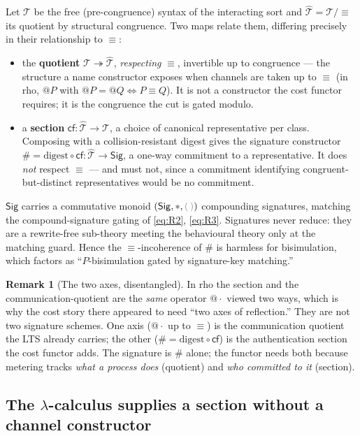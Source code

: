 \documentclass[11pt]{article}
\makeatletter
\theoremstyle{definition}
\newtheorem{remark}[definition]{Remark}
\theoremstyle{plain}
\newcommand{\dec}[1]{\textcolor{costgray}{#1}}   %
\newcommand{\Sig}{\mathsf{Sig}}
\newcommand{\nil}{\dec{(\,)}}                  %
\newcommand{\Seq}{\equiv}
\newcommand{\hashf}{\#}
\newcommand{\quot}[1]{@#1}
\newcommand{\cf}{\mathsf{cf}}
\newcommand{\Term}{\mathcal{T}}
\newcommand{\cTerm}{\widehat{\mathcal{T}}}
\makeatother
\begin{document}
Let $\Term$ be the free (pre-congruence) syntax of the interacting sort
and $\cTerm = \Term/{\Seq}$ its quotient by structural congruence. Two
maps relate them, differing precisely in their relationship to $\Seq$:
%
\begin{itemize}[leftmargin=1.6em,itemsep=2pt]
  \item the \textbf{quotient} $\Term \twoheadrightarrow \cTerm$,
    \emph{respecting} $\Seq$, invertible up to congruence --- the
    structure a name constructor exposes when channels are taken up to
    $\Seq$ (in rho, $\quot{P}$ with $\quot{P}=\quot{Q}\iff P\Seq Q$). It
    is not a constructor the cost functor requires; it is the congruence
    the cut is gated modulo.
  \item a \textbf{section} $\cf : \cTerm \to \Term$, a choice of
    canonical representative per class. Composing with a
    collision-resistant digest gives the signature constructor
    $\hashf = \mathrm{digest}\circ\cf : \cTerm \to \Sig$, a one-way
    commitment to a representative. It does \emph{not} respect $\Seq$ ---
    and must not, since a commitment identifying congruent-but-distinct
    representatives would be no commitment.
\end{itemize}
%
$\Sig$ carries a commutative monoid $(\Sig,*,\nil)$ compounding
signatures, matching the compound-signature gating of \eqref{eq:R2},
\eqref{eq:R3}. Signatures never reduce: they are a rewrite-free
sub-theory meeting the behavioural theory only at the matching guard.
Hence the $\Seq$-incoherence of $\hashf$ is harmless for bisimulation,
which factors as ``$P$-bisimulation gated by signature-key matching.''

\begin{remark}[The two axes, disentangled]
In rho the section and the communication-quotient are the \emph{same}
operator $\quot{\cdot}$ viewed two ways, which is why the cost story there
appeared to need ``two axes of reflection.'' They are not two signature
schemes. One axis ($\quot{\cdot}$ up to $\Seq$) is the communication
quotient the LTS already carries; the other
($\hashf=\mathrm{digest}\circ\cf$) is the authentication section the cost
functor adds. The signature is $\hashf$ alone; the functor needs both
because metering tracks \emph{what a process does} (quotient) and
\emph{who committed to it} (section).
\end{remark}

\subsection{The \texorpdfstring{$\lambda$}{lambda}-calculus supplies a
section without a channel constructor}
\end{document}
